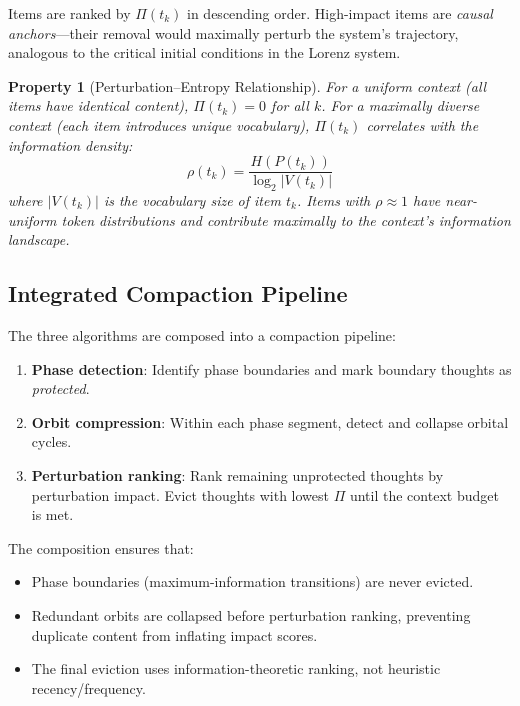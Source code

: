 \documentclass[journal,10pt]{IEEEtran}
\newtheorem{property}{Property}
\begin{document}
Items are ranked by $\Pi(t_k)$ in descending order. High-impact items are \emph{causal anchors}---their removal would maximally perturb the system's trajectory, analogous to the critical initial conditions in the Lorenz system.

\begin{property}[Perturbation--Entropy Relationship]
\label{prop:perturbation}
For a uniform context (all items have identical content), $\Pi(t_k) = 0$ for all $k$. For a maximally diverse context (each item introduces unique vocabulary), $\Pi(t_k)$ correlates with the information density:
\begin{equation}
\rho(t_k) = \frac{H(P(t_k))}{\log_2 |V(t_k)|}
\label{eq:density}
\end{equation}
where $|V(t_k)|$ is the vocabulary size of item $t_k$. Items with $\rho \approx 1$ have near-uniform token distributions and contribute maximally to the context's information landscape.
\end{property}

\subsection{Integrated Compaction Pipeline}

The three algorithms are composed into a compaction pipeline:

\begin{enumerate}[nosep]
\item \textbf{Phase detection}: Identify phase boundaries and mark boundary thoughts as \emph{protected}.
\item \textbf{Orbit compression}: Within each phase segment, detect and collapse orbital cycles.
\item \textbf{Perturbation ranking}: Rank remaining unprotected thoughts by perturbation impact. Evict thoughts with lowest $\Pi$ until the context budget is met.
\end{enumerate}

The composition ensures that:
\begin{itemize}[nosep]
\item Phase boundaries (maximum-information transitions) are never evicted.
\item Redundant orbits are collapsed before perturbation ranking, preventing duplicate content from inflating impact scores.
\item The final eviction uses information-theoretic ranking, not heuristic recency/frequency.
\end{itemize}
\end{document}
